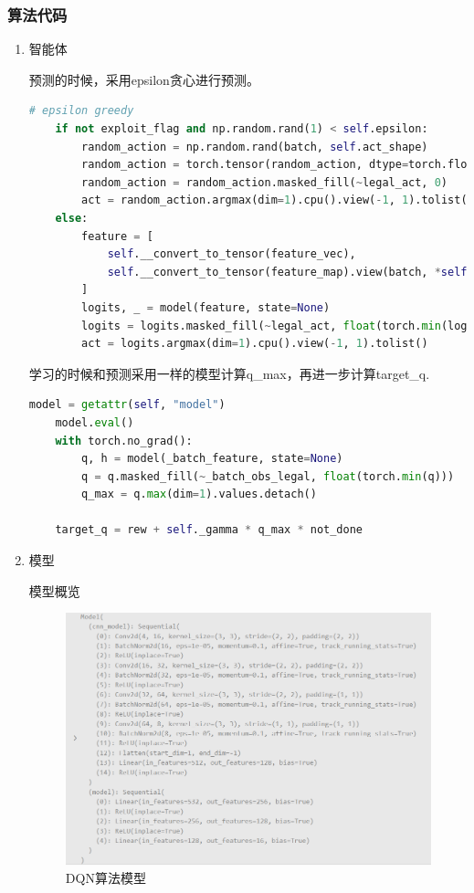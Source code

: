 \subsubsection{算法代码}

\begin{enumerate}
    \item 智能体


预测的时候，采用epsilon贪心进行预测。
\begin{lstlisting}[language=Python]
    # epsilon greedy
    if not exploit_flag and np.random.rand(1) < self.epsilon:
        random_action = np.random.rand(batch, self.act_shape)
        random_action = torch.tensor(random_action, dtype=torch.float32).to(self.device)
        random_action = random_action.masked_fill(~legal_act, 0)
        act = random_action.argmax(dim=1).cpu().view(-1, 1).tolist()
    else:
        feature = [
            self.__convert_to_tensor(feature_vec),
            self.__convert_to_tensor(feature_map).view(batch, *self.obs_split[1]),
        ]
        logits, _ = model(feature, state=None)
        logits = logits.masked_fill(~legal_act, float(torch.min(logits)))
        act = logits.argmax(dim=1).cpu().view(-1, 1).tolist()
\end{lstlisting}

学习的时候和预测采用一样的模型计算q\_max，再进一步计算target\_q.
\begin{lstlisting}[language=Python]
    model = getattr(self, "model")
    model.eval()
    with torch.no_grad():
        q, h = model(_batch_feature, state=None)
        q = q.masked_fill(~_batch_obs_legal, float(torch.min(q)))
        q_max = q.max(dim=1).values.detach()

    target_q = rew + self._gamma * q_max * not_done
\end{lstlisting}

\item 模型

模型概览
\begin{figure}[H]
    \centering
    \includegraphics[width=0.8\linewidth]{pic/DQN-model.png}
    \caption{ DQN算法模型}
    \label{map}
\end{figure}



\end{enumerate}

